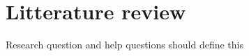 
\chapter{Litterature review}
\label{chapter:litterature}

Research question and help questions should define this
